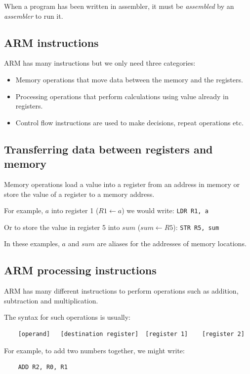 When a program has been written in assembler, it must be {\it assembled} by an {\it assembler} to run it.

\subsection{ARM instructions}

ARM has many instructions but we only need three categories:

\begin{itemize}
	\item Memory operations that move data between the memory and the registers.
	\item Processing operations that perform calculations using value already in registers.
	\item Control flow instructions are used to make decisions, repeat operations etc.
\end{itemize}

\subsection{Transferring data between registers and memory}

Memory operations load a value into a register from an address in memory or
store the value of a register to a memory address.

For example, $a$ into register 1 ($R1 \leftarrow a$) we would write:
{\tt LDR R1, a}

Or to store the value in register 5 into $sum$ ($sum \leftarrow R5$):
{\tt STR R5, sum}

In these examples, $a$ and $sum$ are aliases for the addresses of memory locations.

\subsection{ARM processing instructions}

ARM has many different instructions to perform operations such as addition, subtraction and multiplication.

The syntax for such operations is usually:

\begin{verbatim}
	[operand]	[destination register]	[register 1]	[register 2]
\end{verbatim}

For example, to add two numbers together, we might write:

\begin{verbatim}
	ADD	R2, R0, R1
\end{verbatim}

